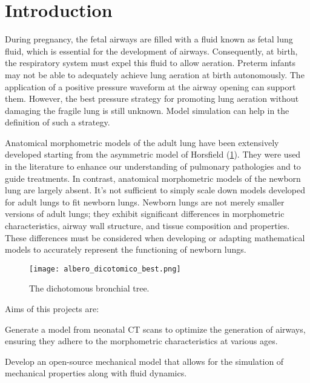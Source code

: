 \section{Introduction}
\label{sec:introduction}
During pregnancy, the fetal airways are filled with a fluid known as
fetal lung fluid, which is essential for the development of
airways. Consequently, at birth, the respiratory system must expel
this fluid to allow aeration. Preterm infants may not be able to
adequately achieve lung aeration at birth autonomously. The
application of a positive pressure waveform at the airway opening can
support them. However, the best pressure strategy for promoting lung
aeration without damaging the fragile lung is still unknown. Model
simulation can help in the definition of such a strategy.


Anatomical morphometric models of the adult lung have been extensively
developed starting from the asymmetric model of Horsfield
(\cref{fig:albero_dicotomico_anatomical}). They were used in the
literature to enhance our understanding of pulmonary pathologies and
to guide treatments. In contrast, anatomical morphometric models of
the newborn lung are largely absent. It's not sufficient to simply
scale down models developed for adult lungs to fit newborn
lungs. Newborn lungs are not merely smaller versions of adult lungs;
they exhibit significant differences in morphometric characteristics,
airway wall structure, and tissue composition and properties. These
differences must be considered when developing or adapting
mathematical models to accurately represent the functioning of newborn
lungs.

\begin{figure}[H]\centering
  \texttt{[image: albero\_dicotomico\_best.png]}
  \caption{The dichotomous bronchial tree.}
  \label{fig:albero_dicotomico_anatomical}
\end{figure}

Aims of this projects are:
\begin{description}
\item Generate a model from neonatal CT scans to optimize the
  generation of airways, ensuring they adhere to the morphometric
  characteristics at various ages.
\item Develop an open-source mechanical model that allows for the
  simulation of mechanical properties along with fluid dynamics.
\end{description}

